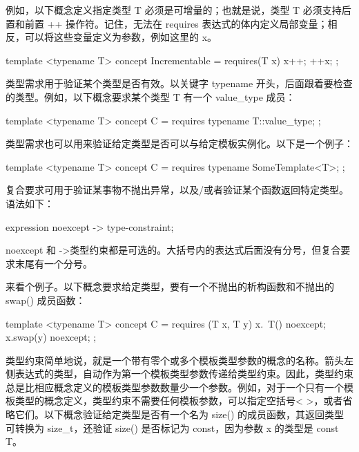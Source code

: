 例如，以下概念定义指定类型 T 必须是可增量的；也就是说，类型 T 必须支持后置和前置 ++ 操作符。记住，无法在 requires 表达式的体内定义局部变量；相反，可以将这些变量定义为参数，例如这里的 x。

\begin{cpp}
template <typename T>
concept Incrementable = requires(T x) { x++; ++x; };
\end{cpp}


类型需求用于验证某个类型是否有效。以关键字 typename 开头，后面跟着要检查的类型。例如，以下概念要求某个类型 T 有一个 value\_type 成员：

\begin{cpp}
template <typename T>
concept C = requires { typename T::value_type; };
\end{cpp}

类型需求也可以用来验证给定类型是否可以与给定模板实例化。以下是一个例子：

\begin{cpp}
template <typename T>
concept C = requires { typename SomeTemplate<T>; };
\end{cpp}



复合要求可用于验证某事物不抛出异常，以及/或者验证某个函数返回特定类型。语法如下：

\begin{cpp}
{ expression } noexcept -> type-constraint;
\end{cpp}

noexcept 和 ->类型约束都是可选的。大括号内的表达式后面没有分号，但复合要求末尾有一个分号。

来看个例子。以下概念要求给定类型，要有一个不抛出的析构函数和不抛出的 swap() 成员函数：

\begin{cpp}
template <typename T>
concept C = requires (T x, T y) {
    { x.~T()} noexcept;
    { x.swap(y) } noexcept;
};
\end{cpp}

类型约束简单地说，就是一个带有零个或多个模板类型参数的概念的名称。箭头左侧表达式的类型，自动作为第一个模板类型参数传递给类型约束。因此，类型约束总是比相应概念定义的模板类型参数数量少一个参数。例如，对于一个只有一个模板类型的概念定义，类型约束不需要任何模板参数，可以指定空括号< >，或者省略它们。以下概念验证给定类型是否有一个名为 size() 的成员函数，其返回类型可转换为 size\_t，还验证 size() 是否标记为 const，因为参数 x 的类型是 const T。

